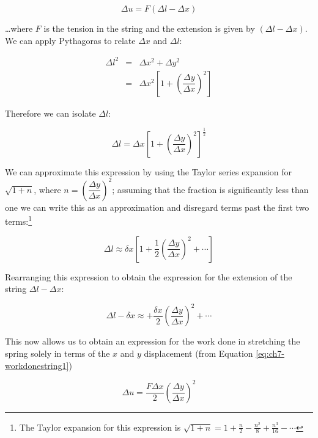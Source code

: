 \documentclass[
]{book}
\begin{document}
\begin{equation}
\Delta u = F(\Delta l - \Delta x)
\label{eq:ch7-workdonestring1}
\end{equation}

\ldots where \(F\) is the tension in the string and the extension is given by \((\Delta l - \Delta x)\). We can apply Pythagoras to relate \(\Delta x\) and \(\Delta l\):

\begin{equation}
\begin{array}{rcl}
\Delta l^2 &=& \Delta x^2 + \Delta y^2 \\
&=& \Delta x^2 \left[ 1 + \left( \dfrac{\Delta y}{\Delta x}\right)^2 \right]
\end{array}
\end{equation}

Therefore we can isolate \(\Delta l\):

\begin{equation}
\Delta l = \Delta x \left[ 1 + \left( \dfrac{\Delta y}{\Delta x}\right)^2 \right]^{\frac{1}{2}}
\end{equation}

We can approximate this expression by using the Taylor series expansion for \(\sqrt{1+n}\), where \(n = \left( \dfrac{\Delta y}{\Delta x}\right)^2\); assuming that the fraction is significantly less than one we can write this as an approximation and disregard terms past the first two terms:\footnote{The Taylor expansion for this expression is \(\sqrt{1+n} = 1+ \frac{n}{2} - \frac{n^2}{8} + \frac{n^3}{16} - \cdots\)}

\begin{equation}
\Delta l \approx \delta x \left[ 1 + \frac{1}{2}\left( \dfrac{\Delta y}{\Delta x}\right)^2 + \cdots \right]
\end{equation}

Rearranging this expression to obtain the expression for the extension of the string \(\Delta l - \Delta x\):

\begin{equation}
\Delta l - \delta x \approx   + \frac{\delta x}{2} \left( \dfrac{\Delta y}{\Delta x}\right)^2 + \cdots
\end{equation}

This now allows us to obtain an expression for the work done in stretching the spring solely in terms of the \(x\) and \(y\) displacement (from Equation \eqref{eq:ch7-workdonestring1})

\begin{equation}
\Delta u = \frac{F\Delta x}{2} \left( \dfrac{\Delta y}{\Delta x}\right)^2
\end{equation}
\end{document}
